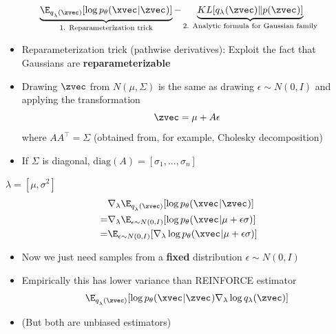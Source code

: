 \begin{frame}
  \begin{center}
   \end{center}

\[ \underbrace{\E_{q_\lambda^{}(\zvec)}[\log  p_\theta(\xvec^{} | \zvec^{})]}_{\text{1. Reparameterization trick}} - \underbrace{KL[q_{\lambda^{}}(\zvec) \Vert p(\zvec^{})]}_{\text{2. Analytic formula for Gaussian family}} \]
\begin{itemize}
\item Reparameterization trick (pathwise derivatives): Exploit the fact that Gaussians are \textbf{reparameterizable}
\item Drawing $\zvec$ from $N(\mu, \Sigma)$ is the same as drawing $\epsilon \sim N(0,I)$ 
and applying the transformation
\[ \zvec = \mu + A\epsilon \]
where $AA^\top = \Sigma$ (obtained from, for example, Cholesky decomposition)
\item If $\Sigma$ is diagonal, $\text{diag}(A)  = [\sigma_1, \dots, \sigma_n]$
\end{itemize}
\end{frame}

\begin{frame}
  \begin{center}
   \end{center}
$\lambda = [\mu, \sigma^2]$
\begin{align*}
&\nabla_\lambda \E_{q_\lambda^{}(\zvec)}[\log  p_\theta(\xvec^{} | \zvec^{})] \\
=& \nabla_\lambda \E_{\epsilon \sim N(0,I)}[\log  p_\theta(\xvec^{} | \mu + \epsilon \sigma  )] \\
=& \E_{\epsilon \sim N(0,I)}[\nabla_\lambda \log  p_\theta(\xvec^{} | \mu + \epsilon \sigma  )] 
\end{align*}
\begin{itemize}
\item Now we just need samples from a \textbf{fixed} distribution $\epsilon \sim N(0, I)$
\item Empirically this has lower variance than REINFORCE estimator
\[ \E_{q_\lambda^{}(\zvec)}[\log  p_\theta(\xvec^{} | \zvec^{})\nabla_\lambda \log q_\lambda (\zvec)] \]
\item (But both are unbiased estimators)
\end{itemize}
\end{frame}

